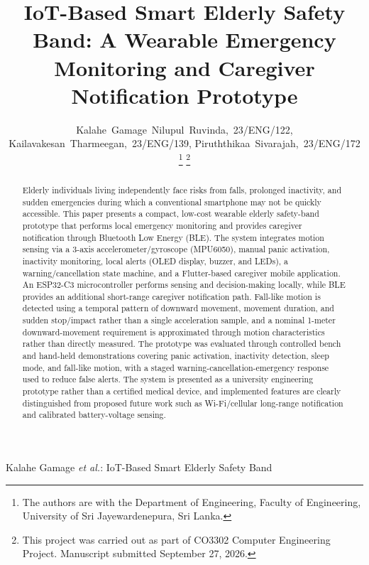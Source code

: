 \documentclass[lettersize,journal]{IEEEtran}
\begin{document}
\title{IoT-Based Smart Elderly Safety Band: A Wearable Emergency Monitoring and Caregiver Notification Prototype}

\author{Kalahe~Gamage~Nilupul~Ruvinda,~23/ENG/122,
Kailavakesan~Tharmeegan,~23/ENG/139,
Piruththikaa~Sivarajah,~23/ENG/172
\thanks{The authors are with the Department of Engineering, Faculty of Engineering, University of Sri Jayewardenepura, Sri Lanka.}
\thanks{This project was carried out as part of CO3302 Computer Engineering Project. Manuscript submitted September 27, 2026.}}

%
{Kalahe Gamage \MakeLowercase{\textit{et al.}}: IoT-Based Smart Elderly Safety Band}

\maketitle

\begin{abstract}
Elderly individuals living independently face risks from falls, prolonged inactivity, and sudden emergencies during which a conventional smartphone may not be quickly accessible. This paper presents a compact, low-cost wearable elderly safety-band prototype that performs local emergency monitoring and provides caregiver notification through Bluetooth Low Energy (BLE). The system integrates motion sensing via a 3-axis accelerometer/gyroscope (MPU6050), manual panic activation, inactivity monitoring, local alerts (OLED display, buzzer, and LEDs), a warning/cancellation state machine, and a Flutter-based caregiver mobile application. An ESP32-C3 microcontroller performs sensing and decision-making locally, while BLE provides an additional short-range caregiver notification path. Fall-like motion is detected using a temporal pattern of downward movement, movement duration, and sudden stop/impact rather than a single acceleration sample, and a nominal 1-meter downward-movement requirement is approximated through motion characteristics rather than directly measured. The prototype was evaluated through controlled bench and hand-held demonstrations covering panic activation, inactivity detection, sleep mode, and fall-like motion, with a staged warning-cancellation-emergency response used to reduce false alerts. The system is presented as a university engineering prototype rather than a certified medical device, and implemented features are clearly distinguished from proposed future work such as Wi-Fi/cellular long-range notification and calibrated battery-voltage sensing.
\end{abstract}
\end{document}
